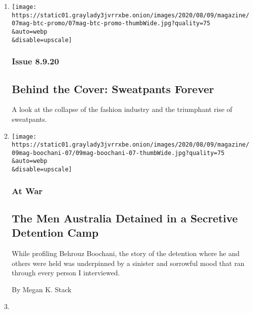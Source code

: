 \begin{enumerate}
\def\labelenumi{\arabic{enumi}.}
\item
  \href{/2020/08/07/magazine/behind-the-cover-sweatpants-forever.html}{}

  \texttt{[image: https://static01.graylady3jvrrxbe.onion/images/2020/08/09/magazine/07mag-btc-promo/07mag-btc-promo-thumbWide.jpg?quality=75\\\&auto=webp\\\&disable=upscale]}

  \hypertarget{issue-8920}{%
  \subsubsection{Issue 8.9.20}\label{issue-8920}}

  \hypertarget{behind-the-cover-sweatpants-forever}{%
  \subsection{Behind the Cover: Sweatpants
  Forever}\label{behind-the-cover-sweatpants-forever}}

  A look at the collapse of the fashion industry and the triumphant rise
  of sweatpants.
\item
  \href{/2020/08/07/magazine/manus-island-detainees-behrouz-boochani.html}{}

  \texttt{[image: https://static01.graylady3jvrrxbe.onion/images/2020/08/09/magazine/09mag-boochani-07/09mag-boochani-07-thumbWide.jpg?quality=75\\\&auto=webp\\\&disable=upscale]}

  \hypertarget{at-war}{%
  \subsubsection{At War}\label{at-war}}

  \hypertarget{the-men-australia-detained-in-a-secretive-detention-camp}{%
  \subsection{The Men Australia Detained in a Secretive Detention
  Camp}\label{the-men-australia-detained-in-a-secretive-detention-camp}}

  While profiling Behrouz Boochani, the story of the detention where he
  and others were held was underpinned by a sinister and sorrowful mood
  that ran through every person I interviewed.

  By Megan K. Stack
\item
  \href{/2020/08/06/magazine/afghan-war-casualty-report-august-2020.html}{}


\end{enumerate}
